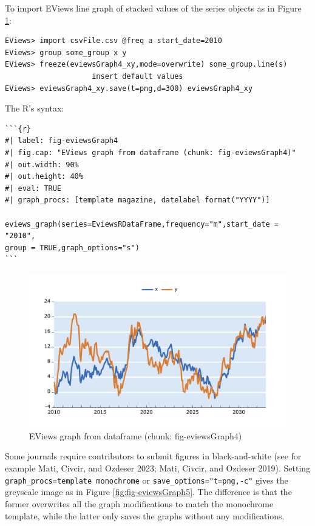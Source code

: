 To import EViews line graph of stacked values of the series objects as in Figure \ref{fig:fig-eviewsGraph4}:

\begin{verbatim}
EViews> import csvFile.csv @freq a start_date=2010
EViews> group some_group x y
EViews> freeze(eviewsGraph4_xy,mode=overwrite) some_group.line(s)
                    insert default values
EViews> eviewsGraph4_xy.save(t=png,d=300) eviewsGraph4_xy
\end{verbatim}

The R's syntax:

\begin{verbatim}
```{r} 
#| label: fig-eviewsGraph4
#| fig.cap: "EViews graph from dataframe (chunk: fig-eviewsGraph4)"
#| out.width: 90%
#| out.height: 40%
#| eval: TRUE
#| graph_procs: [template magazine, datelabel format("YYYY")]

eviews_graph(series=EviewsRDataFrame,frequency="m",start_date = "2010",
group = TRUE,graph_options="s")
```
\end{verbatim}

\begin{figure}

{\centering \includegraphics[width=0.9\linewidth,height=0.4\textheight]{figures/eviewsgraph4-eviewsgraph4-xy} 

}

\caption{EViews graph from dataframe (chunk: fig-eviewsGraph4)}\label{fig:fig-eviewsGraph4}
\end{figure}

Some journals require contributors to submit figures in black-and-white (see for example Mati, Civcir, and Ozdeser 2023; Mati, Civcir, and Ozdeser 2019). Setting \texttt{graph\_procs=\textquotesingle{}template\ monochrome\textquotesingle{}} or \texttt{save\_options="t=png,-c"} gives the greyscale image as in Figure \ref{fig:fig-eviewsGraph5}. The difference is that the former overwrites all the graph modifications to match the monochrome template, while the latter only saves the graphs without any modifications.

